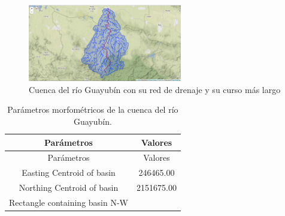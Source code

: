 \documentclass[11pt,]{article}
\begin{document}
\begin{figure}
\centering
\includegraphics[width=0.60000\textwidth]{cuenca-red de drenaje-curso mas largo.png}
\caption{Cuenca del río Guayubín con su red de drenaje y su curso más
largo\label{vectoresrbasin}}
\end{figure}

\begin{longtable}[]{@{}cc@{}}
\caption{\label{tab:parametrosm}Parámetros morfométricos de la cuenca
del río Guayubín.}\tabularnewline
\toprule
\begin{minipage}[b]{0.65\columnwidth}\centering\strut
Parámetros\strut
\end{minipage} & \begin{minipage}[b]{0.29\columnwidth}\centering\strut
Valores\strut
\end{minipage}\tabularnewline
\midrule
\endfirsthead
\toprule
\begin{minipage}[b]{0.65\columnwidth}\centering\strut
Parámetros\strut
\end{minipage} & \begin{minipage}[b]{0.29\columnwidth}\centering\strut
Valores\strut
\end{minipage}\tabularnewline
\midrule
\endhead
\begin{minipage}[t]{0.65\columnwidth}\centering\strut
Easting Centroid of basin\strut
\end{minipage} & \begin{minipage}[t]{0.29\columnwidth}\centering\strut
246465.00\strut
\end{minipage}\tabularnewline
\begin{minipage}[t]{0.65\columnwidth}\centering\strut
Northing Centroid of basin\strut
\end{minipage} & \begin{minipage}[t]{0.29\columnwidth}\centering\strut
2151675.00\strut
\end{minipage}\tabularnewline
\begin{minipage}[t]{0.65\columnwidth}\centering\strut
Rectangle containing basin N-W\strut
\end{minipage} & \begin{minipage}[t]{0.29\columnwidth}\centering\strut

\end{minipage}
\end{longtable}
\end{document}
